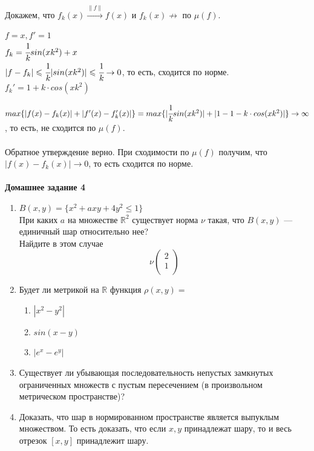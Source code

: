 \documentclass[12pt]{article}
\theoremstyle{definition}
\numberwithin{equation}{section}
\begin{document}
Докажем, что $f_k(x) \overset{\parallel f \parallel}{\rightarrow} f(x)$ и $f_k(x) \nrightarrow$ по $\mu(f)$.
\begin{center}
$f = x, f' = 1$\\
$f_k = \cfrac{1}{k}sin(xk^2)+x$\\
$|f-f_k| \leqslant \cfrac{1}{k} |sin(xk^2)| \leqslant \cfrac{1}{k} \to 0$, то есть, сходится по норме.\\
$f_k' = 1+k \cdot cos(xk^2)$\end{center}
$max \{|f(x)-f_k(x)|+|f'(x)-f_k'(x)|\} = max \{|\cfrac{1}{k}sin(xk^2)|+|1-1-k\cdot cos(xk^2)|\} \to \infty$, то есть, не сходится по $\mu(f)$.\\ \\
Обратное утверждение верно. При сходимости по $\mu(f)$ получим, что $|f(x)-f_k(x)|\to 0$, то есть сходится по норме.\\ \\
\noindent \textbf{Домашнее задание 4}\begin{enumerate}
\item
$B(x, y) = \{x^2+axy+4y^2 \leqslant 1\}$\\
При каких $a$ на множестве $\mathbb{R}^2$ существует норма $\nu$ такая, что $B(x, y)$ --- единичный шар относительно нее? \\Найдите в этом случае
\[\nu \begin{pmatrix}
2 \\
1\\
\end{pmatrix}\]
\item
Будет ли метрикой на $\mathbb{R}$ функция $\rho(x, y) =$\begin{enumerate}
\item $|x^2-y^2|$
\item $sin(x-y)$
\item $|e^x-e^y|$
\end{enumerate}
\item
Существует ли убывающая последовательность непустых замкнутых ограниченных множеств с пустым пересечением (в произвольном метрическом пространстве)?
\item
Доказать, что шар в нормированном пространстве является выпуклым множеством. То есть доказать, что если $x, y$ принадлежат шару, то и весь отрезок $[x, y]$ принадлежит шару.\end{enumerate}
\end{document}

